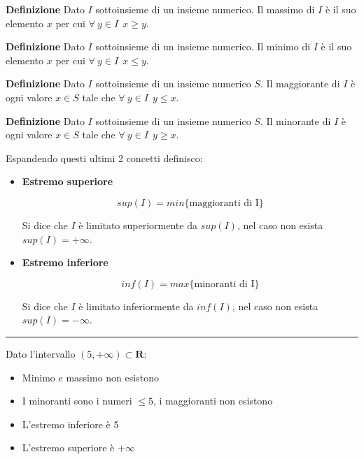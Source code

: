 \documentclass{article}
\begin{document}
\noindent\textbf{Definizione} Dato $I$ sottoinsieme di un insieme numerico. Il massimo di $I$ è il suo elemento $x$ per cui $\forall\ y\in I\ \ x\geq y$.\newline

\noindent\textbf{Definizione} Dato $I$ sottoinsieme di un insieme numerico. Il minimo di $I$ è il suo elemento $x$ per cui $\forall\ y\in I\ \ x\leq y$.\newline

\noindent\textbf{Definizione} Dato $I$ sottoinsieme di un insieme numerico $S$. Il maggiorante di $I$ è ogni valore $x\in S$ tale che $\forall\ y\in I \ \ y\leq x$.\newline

\noindent\textbf{Definizione} Dato $I$ sottoinsieme di un insieme numerico $S$. Il minorante di $I$ è ogni valore $x\in S$ tale che $\forall\ y\in I \ \ y\geq x$.\newline

\newpage

\noindent Espandendo questi ultimi 2 concetti definisco:
\begin{itemize}
    \item \textbf{Estremo superiore}

    $$sup(I)=min\{\text{maggioranti di I}\}$$

    Si dice che $I$ è limitato superiormente da $sup(I)$, nel caso non esista $sup(I)=+\infty$.

    \item \textbf{Estremo inferiore}

    $$inf(I)=max\{\text{minoranti di I}\}$$

    Si dice che $I$ è limitato inferiormente da $inf(I)$, nel caso non esista $sup(I)=-\infty$.
    
\end{itemize}

\noindent\rule{\textwidth}{0.5pt}\newline

\noindent Dato l'intervallo $(5,+\infty)\subset\mathbf{R}$:
\begin{itemize}
    \item Minimo e massimo non esistono
    \item I minoranti sono i numeri $\leq5$, i maggioranti non esistono
    \item L'estremo inferiore è 5
    \item L'estremo superiore è $+\infty$
\end{itemize}
\end{document}
